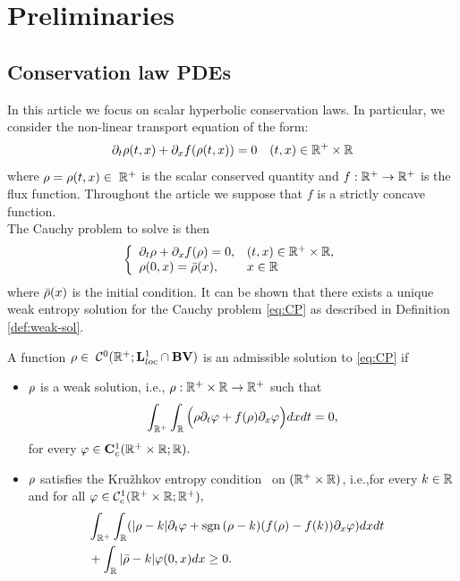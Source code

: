 \section{Preliminaries\label{sec:Preliminaries}}


\subsection{Conservation law PDEs\label{sub:Hyperbolic-PDE's}}

In this article we focus on scalar hyperbolic conservation laws. In particular, we consider the non-linear transport equation of the form:
\begin{equation}
	\partial_t\cvar\left(t,x\right)+\partial_x f\left(\cvar\left(t,x\right)\right)=0 \quad (t,x) \in \R^+ \times \R\label{eq:cons}
\end{equation}
where $\rho=\rho(t,x) \in \; \mathbb{R}^+$ is the scalar conserved quantity and $f:\mathbb{R}^+\rightarrow \mathbb{R}^+$ is the flux function. Throughout the article we suppose that $f$ is a strictly concave function. \\
The Cauchy problem to solve is then 
\begin{equation}
	\label{eq:CP}
	\left\{
	\begin{array}{ll}
		\partial_t \cvar+ \partial_x f(\cvar) =0, & (t,x)\in\R^+\times \R, \\
		\cvar(0,x)=\initstate(x),                 & x \in \R               \\
	\end{array}
	\right.
\end{equation}
where $\bar{\rho}(x)$ is the initial condition.
It can be shown that there exists a unique weak entropy solution for the Cauchy problem \eqref{eq:CP} as described in Definition \ref{def:weak-sol}. 
\begin{defn}\label{def:weak-sol}
	A function $\rho \in \; \mathcal{C}^0(\mathbb{R}^+; \mathbf{L}^1_{loc}\cap \mathbf{BV})$ is an admissible solution to \eqref{eq:CP} if
	\begin{itemize}
		\item $\rho$ is a weak solution, i.e., $\rho : \mathbb{R}^+\times\mathbb{R}\rightarrow \mathbb{R}^+$ such that
		\begin{equation}	
			\int_{\mathbb{R}^+}\int_{\mathbb{R}}\Big( \rho \partial_t\varphi +f(\rho)\partial_x\varphi \Big)dxdt=0, 
		\end{equation}
		for every $\varphi \in \mathbf{C}^1_c(\mathbb{R}^+\times \mathbb{R}; \mathbb{R}).$
		\item $\rho$ satisfies the Kru\v{z}hkov entropy condition~\cite{Kruzkov1970} on $(\mathbb{R}^+\times\mathbb{R})$, i.e.,for every $k\in \mathbb{R}$ and for all $\varphi \in \mathcal{C}^1_c(\mathbb{R}^+\times \mathbb{R};\mathbb{R}^+),$
		\begin{eqnarray}
			\label{eq:kruzhkov}
			&\int_{\R^+}\int_{\R}(\modulo{\cvar -k}  \partial_t \varphi + \sgn{(\cvar-k }) (f(\cvar)-f(k))\partial_x\varphi)dxdt& \nonumber\\
			&+\int_{\R}\modulo{\initstate-k}\varphi(0,x)dx\geq 0.&
		\end{eqnarray} 
	\end{itemize}
\end{defn}
